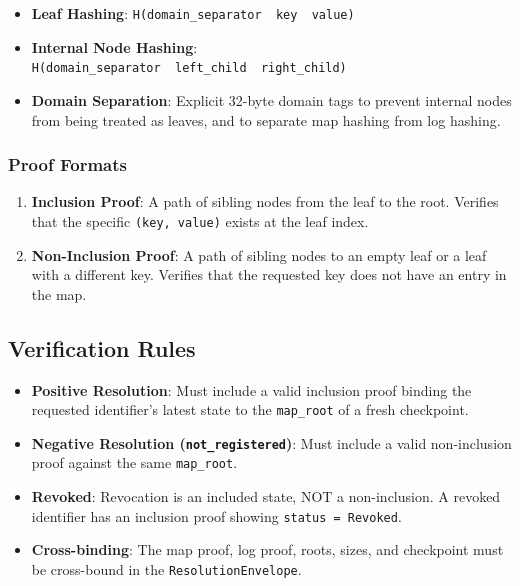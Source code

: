 \documentclass[
]{article}
\providecommand{\tightlist}{%
  \setlength{\itemsep}{0pt}\setlength{\parskip}{0pt}}
\begin{document}
\begin{itemize}
\tightlist
\item
  \textbf{Leaf Hashing}:
  \texttt{H(domain\_separator\ \textbar{}\textbar{}\ key\ \textbar{}\textbar{}\ value)}
\item
  \textbf{Internal Node Hashing}:
  \texttt{H(domain\_separator\ \textbar{}\textbar{}\ left\_child\ \textbar{}\textbar{}\ right\_child)}
\item
  \textbf{Domain Separation}: Explicit 32-byte domain tags to prevent
  internal nodes from being treated as leaves, and to separate map
  hashing from log hashing.
\end{itemize}

\hypertarget{proof-formats}{%
\subsubsection{Proof Formats}\label{proof-formats}}

\begin{enumerate}
\def\labelenumi{\arabic{enumi}.}
\tightlist
\item
  \textbf{Inclusion Proof}: A path of sibling nodes from the leaf to the
  root. Verifies that the specific \texttt{(key,\ value)} exists at the
  leaf index.
\item
  \textbf{Non-Inclusion Proof}: A path of sibling nodes to an empty leaf
  or a leaf with a different key. Verifies that the requested key does
  not have an entry in the map.
\end{enumerate}

\hypertarget{verification-rules}{%
\subsection{Verification Rules}\label{verification-rules}}

\begin{itemize}
\tightlist
\item
  \textbf{Positive Resolution}: Must include a valid inclusion proof
  binding the requested identifier's latest state to the
  \texttt{map\_root} of a fresh checkpoint.
\item
  \textbf{Negative Resolution (\texttt{not\_registered})}: Must include
  a valid non-inclusion proof against the same \texttt{map\_root}.
\item
  \textbf{Revoked}: Revocation is an included state, NOT a
  non-inclusion. A revoked identifier has an inclusion proof showing
  \texttt{status\ =\ Revoked}.
\item
  \textbf{Cross-binding}: The map proof, log proof, roots, sizes, and
  checkpoint must be cross-bound in the \texttt{ResolutionEnvelope}.
\end{itemize}
\end{document}

